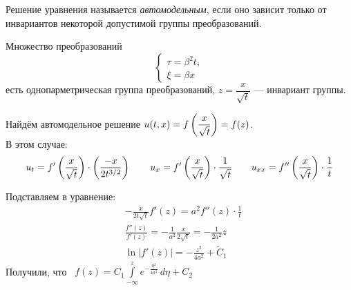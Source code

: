 \documentclass[../main.tex]{subfiles}
\begin{document}
\begin{definition}
Решение уравнения называется \textit{автомодельным}, если оно зависит только от инвариантов некоторой допустимой группы преобразований.
\end{definition}
\begin{example}
Множество преобразований
\begin{equation*}
\begin{cases}
	\tau = \beta^2 t, \\
	\xi = \beta x
\end{cases}
\end{equation*}
есть однопарметрическая группа преобразований, $z = \dfrac{x}{\sqrt{t}} $ --- инвариант группы.
\end{example}
Найдём автомодельное решение $u(t, x) = f\left(\dfrac{x}{\sqrt{t}}\right) = f(z)$. \\
В этом случае:
\begin{equation*}
	u_t = f'\left(\dfrac{x}{\sqrt{t}}\right) \cdot \left(\frac{-x}{2t^{3/2}}\right) 
	\qquad u_x = f'\left(\frac{x}{\sqrt{t}}\right) \cdot \frac{1}{\sqrt{t}} 
	\qquad u_{xx} = f''\left(\frac{x}{\sqrt{t}}\right) \cdot \frac{1}{t}
\end{equation*}

Подставляем в уравнение:
\vspace{-0.7em}
\begin{align*}
	&-\frac{x}{2t\sqrt{t}} f'(z) = a^2 f''(z) \cdot \frac{1}{t}\\[0.3em]
	&\frac{f''(z)}{f'(z)} = - \frac{1}{a^2} \frac{x}{2\sqrt t} = -\frac{1}{2 a^2} z\\[0.2em]
	&\ln|f'(z)| = -\frac{z^2}{4a^2} + \tilde{C}_1
\end{align*}
Получили, что \ $f(z) = C_1 \displaystyle\int\limits_{-\infty}^z e^{-\frac{\eta^2}{4a^2}}\, d\eta + C_2$
\end{document}
